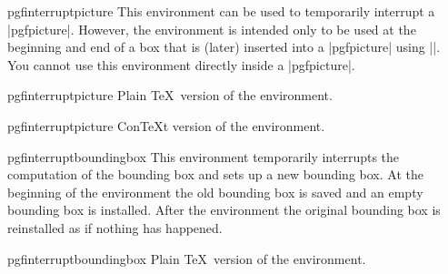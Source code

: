 \begin{environment}{{pgfinterruptpicture}}
  This environment can be used to temporarily interrupt a
  |{pgfpicture}|. However, the environment is intended only to be used
  at the beginning and end of a box that is (later) inserted into a
  |{pgfpicture}| using |\pgfqbox|. You cannot use this environment
  directly inside a |{pgfpicture}|.

\end{environment}

\begin{plainenvironment}{{pgfinterruptpicture}}
  Plain \TeX\ version of the environment.
\end{plainenvironment}

\begin{contextenvironment}{{pgfinterruptpicture}}
  Con\TeX t version of the environment.
\end{contextenvironment}



\begin{environment}{{pgfinterruptboundingbox}}
  This environment temporarily interrupts the computation of the
  bounding box and sets up a new bounding box. At the beginning of the
  environment the old bounding box is saved and an empty bounding box
  is installed. After the environment the original bounding box is
  reinstalled as if nothing has happened.
\end{environment}

\begin{plainenvironment}{{pgfinterruptboundingbox}}
  Plain \TeX\ version of the environment.
\end{plainenvironment}

